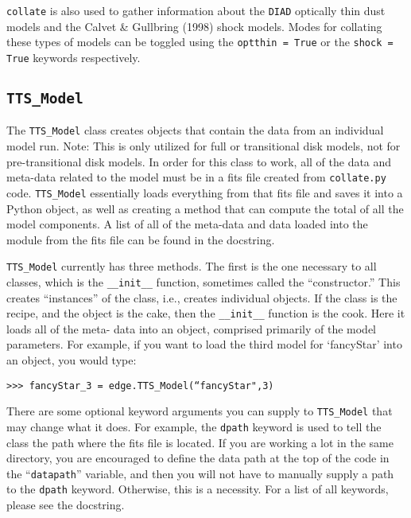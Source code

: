 \documentclass{article}
\begin{document}
\noindent \texttt{collate} is also used to gather information about the \texttt{DIAD} optically thin dust models and the Calvet \& Gullbring (1998) shock models. Modes for collating these types of models can be toggled using the \texttt{optthin = True} or the \texttt{shock = True} keywords respectively.

 
\subsection {\texttt{TTS\_Model}}

\noindent The \texttt{TTS\_Model} class creates objects that contain the data from an individual model run. Note: This is only utilized for full or transitional disk models, not for pre-transitional disk models. In order for this class to work, all of the data and meta-data related to the model must be in a fits file created from \texttt{collate.py} code. \texttt{TTS\_Model} essentially loads everything from that fits file and saves it into a Python object, as well as creating a method that can compute the total of all the model components. A list of all of the meta-data and data loaded into the module from the fits file can be found in the docstring. 
\vspace{2mm}

\noindent \texttt{TTS\_Model} currently has three methods. The first is the one necessary to all classes, which is the \texttt{\_\_init\_\_} function, sometimes called the “constructor.” This creates “instances” of the class, i.e., creates individual objects. If the class is the recipe, and the object is the cake, then the \texttt{\_\_init\_\_} function is the cook. Here it loads all of the meta- data into an object, comprised primarily of the model parameters. For example, if you want to load the third model for `fancyStar' into an object, you would type: 
 
\vspace{2mm}
\texttt{>>> fancyStar\_3 = edge.TTS\_Model(``fancyStar",3)}
\vspace{2mm}

\noindent There are some optional keyword arguments you can supply to \texttt{TTS\_Model} that may change what it does. For example, the \texttt{dpath} keyword is used to tell the class the path where the fits file is located. If you are working a lot in the same directory, you are encouraged to define the data path at the top of the code in the “\texttt{datapath}” variable, and then you will not have to manually supply a path to the \texttt{dpath} keyword. Otherwise, this is a necessity. For a list of all keywords, please see the docstring. 
\vspace{2mm}
\end{document}

